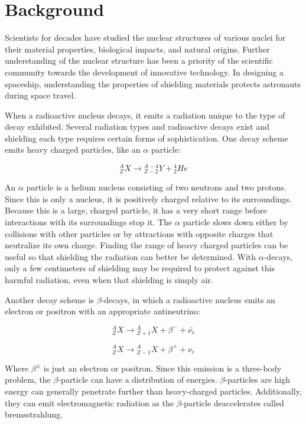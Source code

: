 \section{Background}

Scientists for decades have studied the nuclear structures of various nuclei for their material properties, biological impacts, and natural origins. Further understanding of the nuclear structure has been a priority of the scientific community towards the development of innovative technology. In designing a spaceship, understanding the properties of shielding materials protects astronauts during space travel.

When a radioactive nucleus decays, it emits a radiation unique to the type of decay exhibited. Several radiation types and radioactive decays exist and shielding each type requires certain forms of sophistication. One decay scheme emits heavy charged particles, like an $\alpha$ particle:

\begin{equation}
{}^{A}_{Z}X \rightarrow {}^{A-4}_{Z-2}Y + {}^{4}_{2}{He}
\end{equation}

An $\alpha$ particle is a helium nucleus consisting of two neutrons and two protons. Since this is only a nucleus, it is positively charged relative to its surroundings. Because this is a large, charged particle, it has a very short range before interactions with its surroundings stop it. The $\alpha$ particle slows down either by collisions with other particles or by attractions with opposite charges that neutralize its own charge. Finding the range of heavy charged particles can be useful so that shielding the radiation can better be determined. With $\alpha$-decays, only a few centimeters of shielding may be required to protect against this harmful radiation, even when that shielding is simply air.

Another decay scheme is $\beta$-decays, in which a radioactive nucleus emits an electron or positron with an appropriate antineutrino:

\begin{equation}
{}^{A}_{Z}X \rightarrow {}^{A}_{Z+1}X + \beta^{-} + \bar{\nu_{e}}
\end{equation}

\begin{equation}
{}^{A}_{Z}X \rightarrow {}^{A}_{Z-1}X + \beta^{+} + \nu_{e}
\end{equation}

Where $\beta^{\pm}$ is just an electron or positron. Since this emission is a three-body problem, the $\beta$-particle can have a distribution of energies. $\beta$-particles are high energy can generally penetrate further than heavy-charged particles. Additionally, they can emit electromagnetic radiation as the $\beta$-particle deaccelerates called bremsstrahlung.

